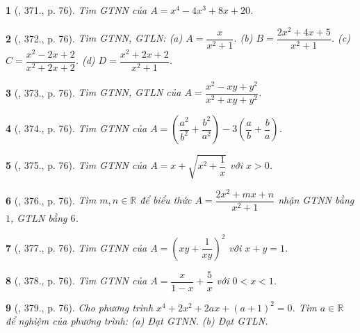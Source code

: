 \documentclass{article}
\newtheorem{baitoan}{}
\begin{document}
\begin{baitoan}[\cite{Binh_Toan_9_tap_2}, 371., p. 76]
	Tìm {\rm GTNN} của $A = x^4 - 4x^3 + 8x + 20$.
\end{baitoan}

\begin{baitoan}[\cite{Binh_Toan_9_tap_2}, 372., p. 76]
	Tìm {\rm GTNN, GTLN}: (a) $A = \dfrac{x}{x^2 + 1}$. (b) $B = \dfrac{2x^2 + 4x + 5}{x^2 + 1}$. (c) $C = \dfrac{x^2 - 2x + 2}{x^2 + 2x + 2}$. (d) $D = \dfrac{x^2 + 2x + 2}{x^2 + 1}$.
\end{baitoan}

\begin{baitoan}[\cite{Binh_Toan_9_tap_2}, 373., p. 76]
	Tìm {\rm GTNN, GTLN} của $A = \dfrac{x^2 - xy + y^2}{x^2 + xy + y^2}$.
\end{baitoan}

\begin{baitoan}[\cite{Binh_Toan_9_tap_2}, 374., p. 76]
	Tìm {\rm GTNN} của $A = \left(\dfrac{a^2}{b^2} + \dfrac{b^2}{a^2}\right) - 3\left(\dfrac{a}{b} + \dfrac{b}{a}\right)$.
\end{baitoan}

\begin{baitoan}[\cite{Binh_Toan_9_tap_2}, 375., p. 76]
	Tìm {\rm GTNN} của $A = x + \sqrt{x^2 + \dfrac{1}{x}}$ với $x > 0$.
\end{baitoan}

\begin{baitoan}[\cite{Binh_Toan_9_tap_2}, 376., p. 76]
	Tìm $m,n\in\mathbb{R}$ để biểu thức $A = \dfrac{2x^2 + mx + n}{x^2 + 1}$ nhận {\rm GTNN} bằng $1$, {\rm GTLN} bằng $6$.
\end{baitoan}

\begin{baitoan}[\cite{Binh_Toan_9_tap_2}, 377., p. 76]
	Tìm {\rm GTNN} của $A = \left(xy + \dfrac{1}{xy}\right)^2$ với $x + y = 1$.
\end{baitoan}

\begin{baitoan}[\cite{Binh_Toan_9_tap_2}, 378., p. 76]
	Tìm {\rm GTNN} của $A = \dfrac{x}{1 - x} + \dfrac{5}{x}$ với $0 < x < 1$.
\end{baitoan}

\begin{baitoan}[\cite{Binh_Toan_9_tap_2}, 379., p. 76]
	Cho phương trình $x^4 + 2x^2 + 2ax + (a + 1)^2 = 0$. Tìm $a\in\mathbb{R}$ để nghiệm của phương trình: (a) Đạt {\rm GTNN}. (b) Đạt {\rm GTLN}.
\end{baitoan}
\end{document}
